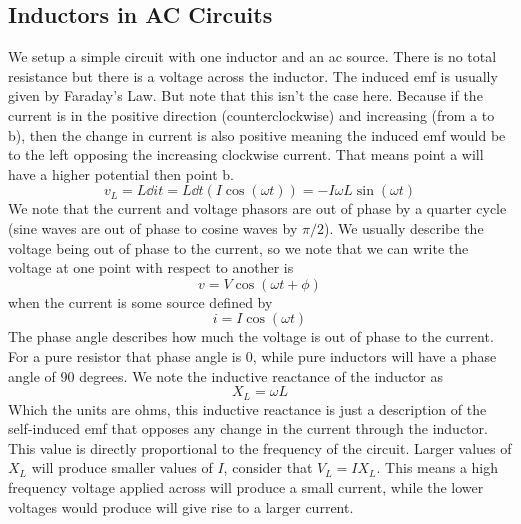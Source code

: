 \subsection{Inductors in AC Circuits}
We setup a simple circuit with one inductor and an ac source. 
There is no total resistance but there is a voltage across the inductor. The induced emf is usually given by Faraday's Law. But note that this isn't the case here. Because if the current is in the positive direction (counterclockwise) and increasing (from a to b), then the change in current is also positive meaning the induced emf would be to the left opposing the increasing clockwise current. That means point a will have a higher potential then point b. 
\begin{equation*}
	v_L = L\dd{i}{t} = L\dd{}{t}(I\cos(\omega t)) = - I\omega L \sin(\omega t)
\end{equation*}
We note that the current and voltage phasors are out of phase by a quarter cycle (sine waves are out of phase to cosine waves by $\pi/2$). We usually describe the voltage being out of phase to the current, so we note that we can write the voltage at one point with respect to another is 
\begin{equation*}
	v = V\cos(\omega t + \phi)
\end{equation*}	
when the current is some source defined by 
\begin{equation*}
	i = I\cos(\omega t)
\end{equation*}
The phase angle describes how much the voltage is out of phase to the current. For a pure resistor that phase angle is 0, while pure inductors will have a phase angle of 90 degrees.
We note the inductive reactance of the inductor as 
\begin{equation*}
	X_L = \omega L
\end{equation*}
Which the units are ohms, this inductive reactance is just a description of the self-induced emf that opposes any change in the current through the inductor. This value is directly proportional to the frequency of the circuit. Larger values of $X_L$ will produce smaller values of $I$, consider that $V_L = IX_L$. This means a high frequency voltage applied across will produce a small current, while the lower voltages would produce will give rise to a larger current. 
